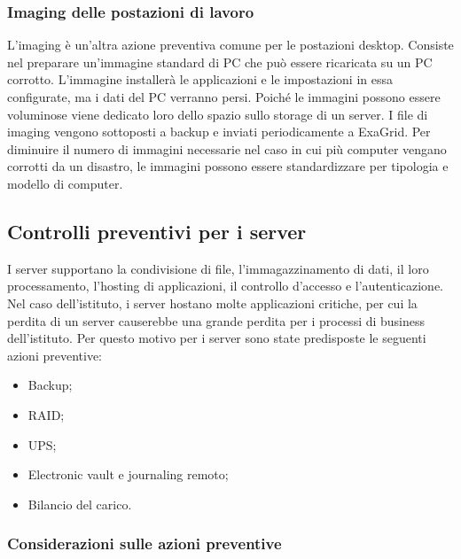 \documentclass[12pt, a4paper, titlepage]{report}
\newcommand{\backupVendor}{ExaGrid} %
\begin{document}
	\subsubsection{Imaging delle postazioni di lavoro}
	
	L'imaging è un'altra azione preventiva comune per le postazioni desktop. Consiste nel preparare un'immagine standard di PC che può essere ricaricata su un PC corrotto. L'immagine installerà le applicazioni e le impostazioni in essa configurate, ma i dati del PC verranno persi. Poiché le immagini possono essere voluminose viene dedicato loro dello spazio sullo storage di un server. I file di imaging vengono sottoposti a backup e inviati periodicamente a \backupVendor. Per diminuire il numero di immagini necessarie nel caso in cui più computer vengano corrotti da un disastro, le immagini possono essere standardizzare per tipologia e modello di computer.
	\newpage
	
	\subsection{Controlli preventivi per i server} \label{server}
	
	I server supportano la condivisione di file, l'immagazzinamento di dati, il loro processamento, l'hosting di applicazioni, il controllo d'accesso e l'autenticazione. Nel caso dell'istituto, i server hostano molte applicazioni critiche, per cui la perdita di un server causerebbe una grande perdita per i processi di business dell'istituto. Per questo motivo per i server sono state predisposte le seguenti azioni preventive:
	\begin{itemize}
		\item Backup;
		\item RAID;
		\item UPS;
		\item Electronic vault e journaling remoto;
		\item Bilancio del carico.
	\end{itemize}
	
	\subsubsection{Considerazioni sulle azioni preventive}
	
\end{document}
